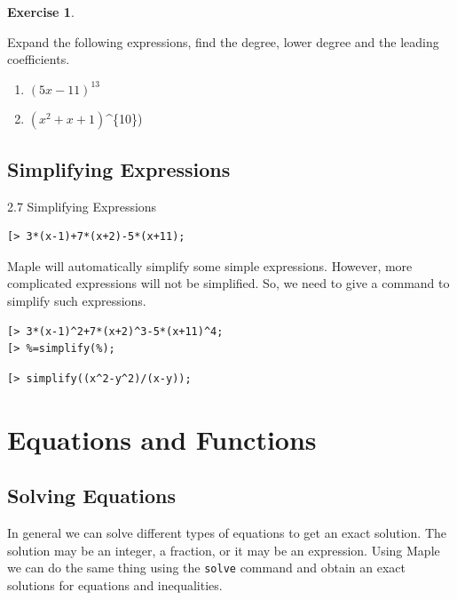 \documentclass[
]{book}
\providecommand{\tightlist}{%
  \setlength{\itemsep}{0pt}\setlength{\parskip}{0pt}}
\theoremstyle{definition}
\theoremstyle{definition}
\theoremstyle{definition}
\newtheorem{exercise}{Exercise}[chapter]
\theoremstyle{definition}
\theoremstyle{remark}
\begin{document}
\begin{exercise}
\protect\hypertarget{exr:unnamed-chunk-17}{}\label{exr:unnamed-chunk-17}

Expand the following expressions, find the degree, lower degree and the leading coefficients.

\begin{enumerate}
\def\labelenumi{\roman{enumi}.}
\tightlist
\item
  \((5x − 11)^{13}\)
\item
  \((x^2 + x + 1)\)\^{}\{10\})
\end{enumerate}

\end{exercise}

\section{Simplifying Expressions}\label{simplifying-expressions}

2.7 Simplifying Expressions

\begin{verbatim}
[> 3*(x-1)+7*(x+2)-5*(x+11);
\end{verbatim}

Maple will automatically simplify some simple expressions. However, more complicated expressions will not be simplified. So, we need to give a command to simplify such expressions.

\begin{verbatim}
[> 3*(x-1)^2+7*(x+2)^3-5*(x+11)^4;
[> %=simplify(%);
\end{verbatim}

\begin{verbatim}
[> simplify((x^2-y^2)/(x-y));
\end{verbatim}

\chapter{Equations and Functions}\label{equations-and-functions}

\section{Solving Equations}\label{solving-equations}

In general we can solve different types of equations to get an exact solution. The solution may be an integer, a fraction, or it may be an expression. Using Maple we can do the same thing using the \texttt{solve} command and obtain an exact solutions for equations and inequalities.
\end{document}
